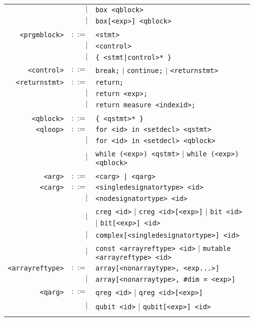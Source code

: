 \documentclass[notitlepage]{article}
\begin{document}
\begin{longtable}{rrl}
	    & $\mid$ & \texttt{box <qblock>} \\
	    & $\mid$ & \texttt{box[<exp>] <qblock>} \\ \\
	\texttt{<prgmblock>} & $::=$ & \texttt{<stmt>} \\
	    & $\mid$ & \texttt{<control>} \\
	    & $\mid$ & \texttt{\{ <stmt|control>* \}} \\
	\texttt{<control>} & $::=$ & \texttt{break;} $\mid$ \texttt{continue;} $\mid$ \texttt{<returnstmt>} \\
	\texttt{<returnstmt>} & $::=$ & \texttt{return;} \\
	    & $\mid$ & \texttt{return <exp>;} \\
	    & $\mid$ & \texttt{return measure <indexid>;} \\ \\
	\texttt{<qblock>} & $::=$ & \texttt{\{ <qstmt>* \}} \\
	\texttt{<qloop>} & $::=$ & \texttt{for <id> in <setdecl> <qstmt>} \\
	    & $\mid$ & \texttt{for <id> in <setdecl> <qblock>} \\
	    & $\mid$ & \texttt{while (<exp>) <qstmt>} $\mid$ \texttt{while (<exp>) <qblock>} \\ \\
	\texttt{<arg>} & $::=$ & \texttt{<carg> | <qarg>} \\
	\texttt{<carg>} & $::=$ & \texttt{<singledesignatortype> <id>} \\
	    & $\mid$ & \texttt{<nodesignatortype> <id>} \\
	    & $\mid$ & \texttt{creg <id>} $\mid$ \texttt{creg <id>[<exp>]} $\mid$ \texttt{bit <id>} $\mid$ \texttt{bit[<exp>] <id>} \\
	    & $\mid$ & \texttt{complex[<singledesignatortype>] <id>} \\
	    & $\mid$ & \texttt{const <arrayreftype> <id>} $\mid$ \texttt{mutable <arrayreftype> <id>} \\
    \texttt{<arrayreftype>} & $::=$ & \texttt{array[<nonarraytype>, <exp...>]} \\
        & $\mid$ & \texttt{array[<nonarraytype>, \#dim = <exp>]} \\
	\texttt{<qarg>} & $::=$ & \texttt{qreg <id>} $\mid$ \texttt{qreg <id>[<exp>]} \\
	    & $\mid$ & \texttt{qubit <id>} $\mid$ \texttt{qubit[<exp>] <id>} \\ \\

\end{longtable}
\end{document}
